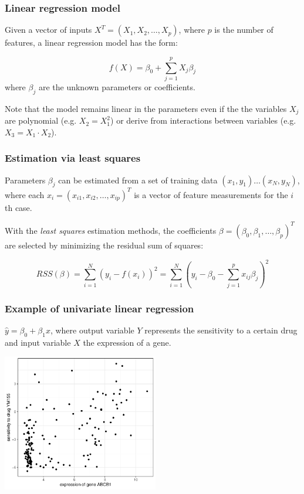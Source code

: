 \documentclass[notes]{beamer}          %
\begin{document}
\begin{frame}
\frametitle{Linear regression model}
Given a vector of inputs $X^T = (X_1, X_2, \dots, X_p)$, where $p$ is the number of features, a linear regression model has the form:

\begin{equation*}
f(X)=\beta_0 + \sum_{j=1}^p X_j\beta_j
\end{equation*}
where $\beta_j$ are the unknown parameters or coefficients. 

\vspace{5mm} 

Note that the model remains linear in the parameters even if the the variables $X_j$ are polynomial (e.g. $X_2 = X_1^2$) or derive from interactions between variables (e.g. $X_3 = X_1 \cdot X_2$).

\end{frame}

\begin{frame}
\frametitle{Estimation via least squares}
Parameters $\beta_j$ can be estimated from a set of training data $(x_1,y_1) \dots (x_N,y_N)$, where each $x_i=(x_{i1}, x_{i2}, \dots, x_{ip})^T$ is a vector of feature measurements for the $i$th case.

\vspace{5mm} 

With the \textit{least squares} estimation methods, the coefficients $\beta=(\beta_0, \beta_1, \dots, \beta_p)^T$ are selected by minimizing the residual sum of squares:

\begin{equation*}
RSS(\beta) = \sum_{i=1}^N (y_i - f(x_i))^2 = \sum_{i=1}^N (y_i - \beta_0 -  \sum_{j=1}^p x_{ij}\beta_j)^2
\end{equation*}
\end{frame}

\begin{frame}
\frametitle{Example of univariate linear regression}
$\hat{y} = \beta_0 + \beta_1 x$, where output variable $Y$ represents the sensitivity to a certain drug and input variable $X$ the expression of a gene.

\begin{center}
\includegraphics[height=6cm]{../figures/week_2_linear_models/Univariate_linear_regression_0.pdf}
\end{center}

\end{frame}
\end{document}
